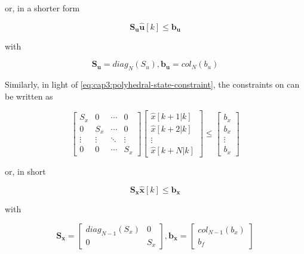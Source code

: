 \noindent
or, in a shorter form

\noindent
\begin{equation}
	\mathbf{S_u \hat{u}}[k] \leq \mathbf{b_u}
\end{equation}

\noindent
with

\noindent
\begin{equation}
	\mathbf{S_u} = diag_N(S_u), \mathbf{b_u} = col_N(b_u)
\end{equation}

Similarly, in light of \eqref{eq:cap3:polyhedral-state-constraint}, the constraints on  can be written as

\begin{equation}
	\left[
		\begin{matrix}
			S_x & 0 & \cdots & 0 \\
			0 & S_x & \cdots & 0 \\
			\vdots & \vdots & \ddots & \vdots \\
			0 & 0 & \cdots & S_x
		\end{matrix}
	\right]
	\left[
		\begin{matrix}
			\hat{x}[k + 1 | k] \\
			\hat{x}[k + 2 | k] \\
			\vdots \\
			\hat{x}[k + N | k]
		\end{matrix}
	\right]
	\leq
	\left[
		\begin{matrix}
			b_x \\
			b_x \\
			\vdots \\
			b_x
		\end{matrix}
	\right]
\end{equation}

\noindent
or, in short

\noindent
\begin{equation}
	\label{eq:cap3:prediction-state-constraint}
	\mathbf{S_x}\mathbf{\hat{x}}[k] \leq \mathbf{b_x}
\end{equation}

\noindent
with

\noindent
\begin{equation}
	\mathbf{S_x} = 
	\left[
		\begin{matrix}
			diag_{N-1}(S_x) & 0 \\
			0 & S_x
		\end{matrix}
	\right], \mathbf{b_x} = 
	\left[
		\begin{matrix}
			col_{N-1}(b_x) \\
			b_f
		\end{matrix}
	\right]
\end{equation}

